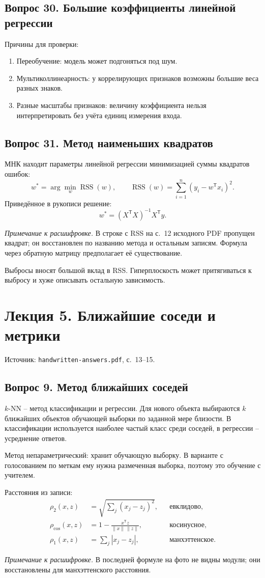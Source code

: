 \documentclass[11pt,a4paper]{article}
\newcommand{\source}[1]{{\small\color{muted}Источник: \texttt{handwritten-answers.pdf}, с.~#1.}\par}
\newcommand{\ednote}[1]{\par{\small\color{muted}\textit{Примечание к расшифровке.} #1}\par}
\newcommand{\question}[2]{\subsection{Вопрос #1. #2}}
\newcommand{\RSS}{\operatorname{RSS}}
\begin{document}
\question{30}{Большие коэффициенты линейной регрессии}
Причины для проверки:
\begin{enumerate}
\item Переобучение: модель может подгоняться под шум.
\item Мультиколлинеарность: у коррелирующих признаков возможны большие веса
разных знаков.
\item Разные масштабы признаков: величину коэффициента нельзя интерпретировать
без учёта единиц измерения входа.
\end{enumerate}

\question{31}{Метод наименьших квадратов}
МНК находит параметры линейной регрессии минимизацией суммы квадратов ошибок:
\[
 w^*=\arg\min_w\RSS(w),\qquad
 \RSS(w)=\sum_{i=1}^{n}(y_i-w^\mathsf T x_i)^2.
\]
Приведённое в рукописи решение:
\[
 w^*=(X^\mathsf T X)^{-1}X^\mathsf T y.
\]
\ednote{В строке с RSS на с.~12 исходного PDF пропущен квадрат;
он восстановлен по названию метода и остальным записям.
Формула через обратную матрицу предполагает её существование.}

Выбросы вносят большой вклад в RSS. Гиперплоскость может притягиваться
к выбросу и хуже описывать остальную зависимость.

\clearpage
\section{Лекция 5. Ближайшие соседи и метрики}
\source{13--15}

\question{9}{Метод ближайших соседей}
$k$-NN -- метод классификации и регрессии. Для нового объекта выбираются
$k$ ближайших объектов обучающей выборки по заданной мере близости.
В классификации используется наиболее частый класс среди соседей,
в регрессии -- усреднение ответов.

Метод непараметрический: хранит обучающую выборку. В варианте
с голосованием по меткам ему нужна размеченная выборка, поэтому это обучение
с учителем.

Расстояния из записи:
\begin{align*}
 \rho_2(x,z)&=\sqrt{\sum_j(x_j-z_j)^2}, &&\text{евклидово},\\
 \rho_{\cos}(x,z)&=1-\frac{x^\mathsf Tz}{\|x\|\,\|z\|}, &&\text{косинусное},\\
 \rho_1(x,z)&=\sum_j|x_j-z_j|, &&\text{манхэттенское}.
\end{align*}
\ednote{В последней формуле на фото не видны модули;
они восстановлены для манхэттенского расстояния.}
\end{document}
